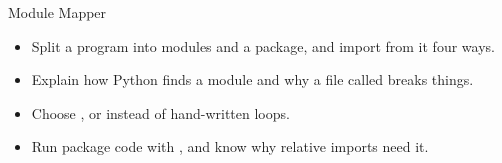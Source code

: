 \begin{achievement}{Module Mapper}
\begin{itemize}[leftmargin=*,itemsep=1pt]
\item Split a program into modules and a package, and import from it four ways.
\item Explain how Python finds a module and why a file called  breaks things.
\item Choose ,  or  instead of hand-written loops.
\item Run package code with , and know why relative imports need it.
\end{itemize}
\end{achievement}

